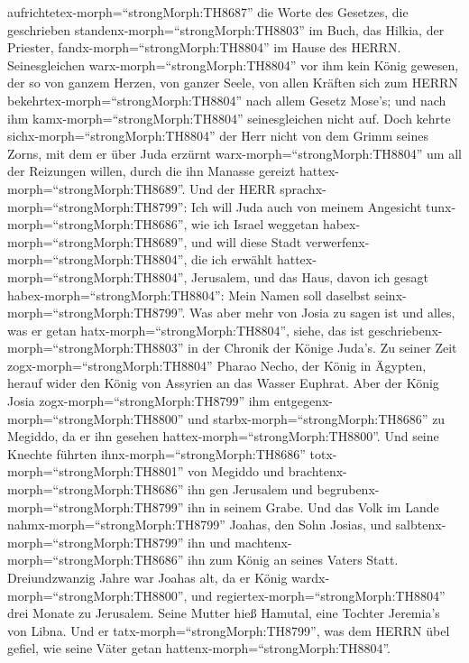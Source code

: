 aufrichtetex-morph=``strongMorph:TH8687'' die Worte des Gesetzes, die
geschrieben standenx-morph=``strongMorph:TH8803'' im Buch, das Hilkia,
der Priester, fandx-morph=``strongMorph:TH8804'' im Hause des HERRN.
 Seinesgleichen warx-morph=``strongMorph:TH8804'' vor ihm
kein König gewesen, der so von ganzem Herzen, von ganzer Seele, von
allen Kräften sich zum HERRN bekehrtex-morph=``strongMorph:TH8804'' nach
allem Gesetz Mose's; und nach ihm kamx-morph=``strongMorph:TH8804''
seinesgleichen nicht auf.  Doch kehrte
sichx-morph=``strongMorph:TH8804'' der Herr nicht von dem Grimm seines
Zorns, mit dem er über Juda erzürnt warx-morph=``strongMorph:TH8804'' um
all der Reizungen willen, durch die ihn Manasse gereizt
hattex-morph=``strongMorph:TH8689''.  Und der HERR
sprachx-morph=``strongMorph:TH8799'': Ich will Juda auch von meinem
Angesicht tunx-morph=``strongMorph:TH8686'', wie ich Israel weggetan
habex-morph=``strongMorph:TH8689'', und will diese Stadt
verwerfenx-morph=``strongMorph:TH8804'', die ich erwählt
hattex-morph=``strongMorph:TH8804'', Jerusalem, und das Haus, davon ich
gesagt habex-morph=``strongMorph:TH8804'': Mein Namen soll daselbst
seinx-morph=``strongMorph:TH8799''.  Was aber mehr von
Josia zu sagen ist und alles, was er getan
hatx-morph=``strongMorph:TH8804'', siehe, das ist
geschriebenx-morph=``strongMorph:TH8803'' in der Chronik der Könige
Juda's.  Zu seiner Zeit zogx-morph=``strongMorph:TH8804''
Pharao Necho, der König in Ägypten, herauf wider den König von Assyrien
an das Wasser Euphrat. Aber der König Josia
zogx-morph=``strongMorph:TH8799'' ihm
entgegenx-morph=``strongMorph:TH8800'' und
starbx-morph=``strongMorph:TH8686'' zu Megiddo, da er ihn gesehen
hattex-morph=``strongMorph:TH8800''.  Und seine Knechte
führten ihnx-morph=``strongMorph:TH8686''
totx-morph=``strongMorph:TH8801'' von Megiddo und
brachtenx-morph=``strongMorph:TH8686'' ihn gen Jerusalem und
begrubenx-morph=``strongMorph:TH8799'' ihn in seinem Grabe. Und das Volk
im Lande nahmx-morph=``strongMorph:TH8799'' Joahas, den Sohn Josias, und
salbtenx-morph=``strongMorph:TH8799'' ihn und
machtenx-morph=``strongMorph:TH8686'' ihn zum König an seines Vaters
Statt.  Dreiundzwanzig Jahre war Joahas alt, da er König
wardx-morph=``strongMorph:TH8800'', und
regiertex-morph=``strongMorph:TH8804'' drei Monate zu Jerusalem. Seine
Mutter hieß Hamutal, eine Tochter Jeremia's von Libna.  Und
er tatx-morph=``strongMorph:TH8799'', was dem HERRN übel gefiel, wie
seine Väter getan hattenx-morph=``strongMorph:TH8804''. 
